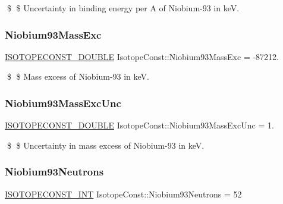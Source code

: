 \$ \$ Uncertainty in binding energy per A of Niobium-\/93 in keV. \mbox{\label{group___isotope_const-_niobium-_nb93_ga1becd7697a77a8174f6944a68d42a366}} 
\subsubsection{\texorpdfstring{Niobium93\+Mass\+Exc}{Niobium93MassExc}}
{\footnotesize\ttfamily \mbox{\hyperlink{group___isotope_const-_macros_ga8f45a7272ce02c0b4c65c44636ed719a}{I\+S\+O\+T\+O\+P\+E\+C\+O\+N\+S\+T\+\_\+\+D\+O\+U\+B\+LE}} Isotope\+Const\+::\+Niobium93\+Mass\+Exc = -\/87212.}

\$ \$ Mass excess of Niobium-\/93 in keV. \mbox{\label{group___isotope_const-_niobium-_nb93_ga0be31d6daef5ae8b273b43108c22ee65}} 
\subsubsection{\texorpdfstring{Niobium93\+Mass\+Exc\+Unc}{Niobium93MassExcUnc}}
{\footnotesize\ttfamily \mbox{\hyperlink{group___isotope_const-_macros_ga8f45a7272ce02c0b4c65c44636ed719a}{I\+S\+O\+T\+O\+P\+E\+C\+O\+N\+S\+T\+\_\+\+D\+O\+U\+B\+LE}} Isotope\+Const\+::\+Niobium93\+Mass\+Exc\+Unc = 1.}

\$ \$ Uncertainty in mass excess of Niobium-\/93 in keV. \mbox{\label{group___isotope_const-_niobium-_nb93_ga91df60cf483ff069c4135af5a4f5b894}} 
\subsubsection{\texorpdfstring{Niobium93\+Neutrons}{Niobium93Neutrons}}
{\footnotesize\ttfamily \mbox{\hyperlink{group___isotope_const-_macros_ga5f18360b3e99483a35c32d789e62621c}{I\+S\+O\+T\+O\+P\+E\+C\+O\+N\+S\+T\+\_\+\+I\+NT}} Isotope\+Const\+::\+Niobium93\+Neutrons = 52}

